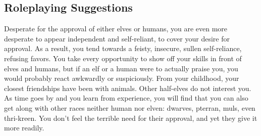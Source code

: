 \subsection{Roleplaying Suggestions}
Desperate for the approval of either elves or humans, you are even more desperate to appear independent and self-reliant, to cover your desire for approval. As a result, you tend towards a feisty, insecure, sullen self-reliance, refusing favors. You take every opportunity to show off your skills in front of elves and humans, but if an elf or a human were to actually praise you, you would probably react awkwardly or suspiciously. From your childhood, your closest friendships have been with animals. Other half-elves do not interest you. As time goes by and you learn from experience, you will find that you can also get along with other races neither human nor elven: dwarves, pterran, muls, even thri-kreen. You don't feel the terrible need for their approval, and yet they give it more readily.

